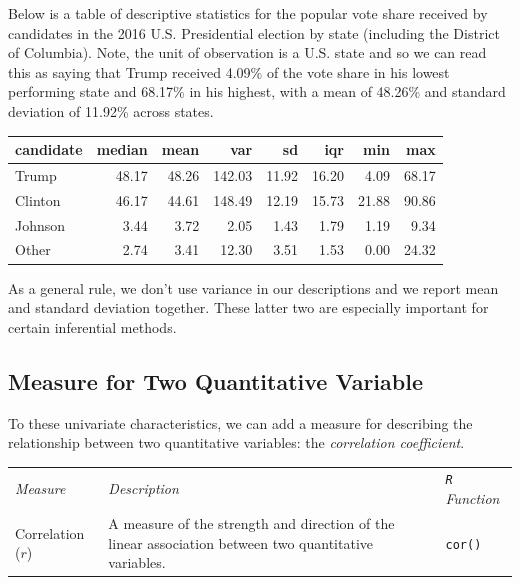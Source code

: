 \documentclass[
  letterpaper,
]{book}
\begin{document}
Below is a table of descriptive statistics for the popular vote share
received by candidates in the 2016 U.S. Presidential election by state
(including the District of Columbia). Note, the unit of observation is a
U.S. state and so we can read this as saying that Trump received 4.09\%
of the vote share in his lowest performing state and 68.17\% in his
highest, with a mean of 48.26\% and standard deviation of 11.92\% across
states.

\begin{longtable}[]{@{}lrrrrrrr@{}}
\toprule\noalign{}
candidate & median & mean & var & sd & iqr & min & max \\
\midrule\noalign{}
\endhead
\bottomrule\noalign{}
\endlastfoot
Trump & 48.17 & 48.26 & 142.03 & 11.92 & 16.20 & 4.09 & 68.17 \\
Clinton & 46.17 & 44.61 & 148.49 & 12.19 & 15.73 & 21.88 & 90.86 \\
Johnson & 3.44 & 3.72 & 2.05 & 1.43 & 1.79 & 1.19 & 9.34 \\
Other & 2.74 & 3.41 & 12.30 & 3.51 & 1.53 & 0.00 & 24.32 \\
\end{longtable}

As a general rule, we don't use variance in our descriptions and we
report mean and standard deviation together. These latter two are
especially important for certain inferential methods.

\hypertarget{measure-for-two-quantitative-variable}{%
\subsection{Measure for Two Quantitative
Variable}\label{measure-for-two-quantitative-variable}}

To these univariate characteristics, we can add a measure for describing
the relationship between two quantitative variables: the
\emph{correlation coefficient}.

\begin{longtable}[]{@{}
  >{\raggedright\arraybackslash}p{}
  >{\raggedright\arraybackslash}p{}
  >{\raggedright\arraybackslash}p{}@{}}
\toprule\noalign{}
\endhead
\bottomrule\noalign{}
\endlastfoot
\emph{Measure} & \emph{Description} & \emph{\texttt{R} Function} \\
Correlation (\(r\)) & A measure of the strength and direction of the
linear association between two quantitative variables. &
\texttt{cor()} \\
\end{longtable}
\end{document}
